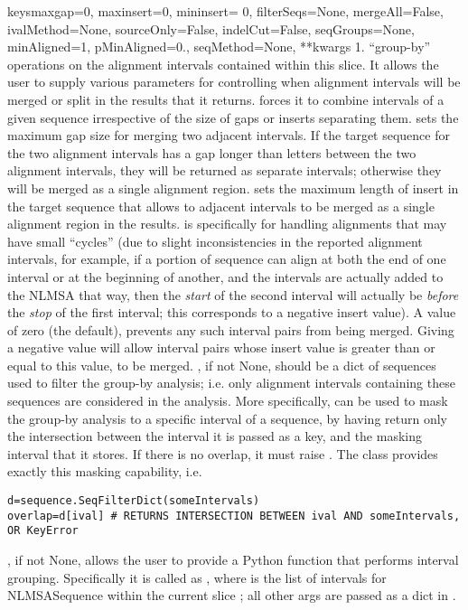 \documentclass{howto}
\begin{document}
\begin{funcdesc}{keys}{maxgap=0, maxinsert=0, mininsert= 0, filterSeqs=None, mergeAll=False, ivalMethod=None, sourceOnly=False, indelCut=False, seqGroups=None, minAligned=1, pMinAligned=0., seqMethod=None, **kwargs}
  1. ``group-by'' operations on the alignment intervals
  contained within this slice.  It allows the user to supply
  various parameters for controlling when alignment intervals will be
  merged or split in the results that it returns.  
  forces it to combine intervals of a given sequence irrespective
  of the size of gaps or inserts separating them.   sets the
  maximum gap size for merging two adjacent intervals.  If the target sequence
  for the two alignment intervals has a gap longer than  
  letters between the two alignment intervals, they will be returned as
  separate intervals; otherwise they will be merged as a single alignment
  region.   sets the maximum length of insert in the target
  sequence that allows to adjacent intervals to be merged as a single alignment
  region in the results.   is specifically for handling
  alignments that may have small ``cycles'' (due to slight inconsistencies
  in the reported alignment intervals, for example, if a portion of sequence
  can align at both the end of one interval or at the beginning of another, and
  the intervals are actually added to the NLMSA that way, then the {\em start}
  of the second interval will actually be {\em before} the {\em stop} of 
  the first interval; this corresponds to a negative insert value).  A
   value of zero (the default), prevents any such interval
  pairs from being merged.  Giving a negative  value will allow
  interval pairs whose insert value is greater than or equal to this value, 
  to be merged.  , if not None, should be a dict of sequences
  used to filter the group-by analysis; i.e. only alignment intervals 
  containing these sequences are considered in the analysis.  More
  specifically,  can be used to mask the group-by analysis
  to a specific interval of a sequence, by having 
  return only the intersection between the interval it is passed as a key,
  and the masking interval that it stores.  If there is no overlap, it
  must raise .  The  class
  provides exactly this masking capability, i.e.
\begin{verbatim}
d=sequence.SeqFilterDict(someIntervals)
overlap=d[ival] # RETURNS INTERSECTION BETWEEN ival AND someIntervals, OR KeyError
\end{verbatim}
  ,
  if not None, allows the user to provide a Python function that performs
  interval grouping.  Specifically it is called as
  , where  is the
  list of intervals for NLMSASequence  within the current slice 
  ; all other args are passed as a dict in .


\end{funcdesc}
\end{document}
